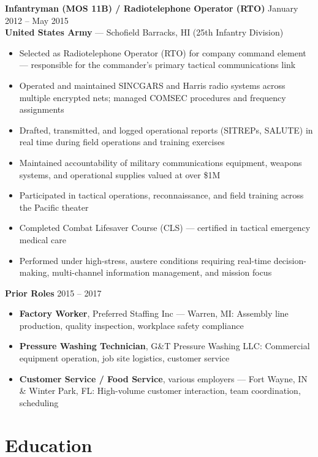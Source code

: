\documentclass[11pt,letterpaper]{article}
\begin{document}
\bigskip

\textbf{Infantryman (MOS 11B) / Radiotelephone Operator (RTO)} \hfill January 2012 -- May 2015\\
\textbf{United States Army} --- Schofield Barracks, HI (25th Infantry Division)
\begin{itemize}
  \item Selected as Radiotelephone Operator (RTO) for company command element --- responsible for the commander's primary tactical communications link
  \item Operated and maintained SINCGARS and Harris radio systems across multiple encrypted nets; managed COMSEC procedures and frequency assignments
  \item Drafted, transmitted, and logged operational reports (SITREPs, SALUTE) in real time during field operations and training exercises
  \item Maintained accountability of military communications equipment, weapons systems, and operational supplies valued at over \$1M
  \item Participated in tactical operations, reconnaissance, and field training across the Pacific theater
  \item Completed Combat Lifesaver Course (CLS) --- certified in tactical emergency medical care
  \item Performed under high-stress, austere conditions requiring real-time decision-making, multi-channel information management, and mission focus
\end{itemize}

\bigskip

\textbf{Prior Roles} \hfill 2015 -- 2017
\begin{itemize}
  \item \textbf{Factory Worker}, Preferred Staffing Inc --- Warren, MI: Assembly line production, quality inspection, workplace safety compliance
  \item \textbf{Pressure Washing Technician}, G\&T Pressure Washing LLC: Commercial equipment operation, job site logistics, customer service
  \item \textbf{Customer Service / Food Service}, various employers --- Fort Wayne, IN \& Winter Park, FL: High-volume customer interaction, team coordination, scheduling
\end{itemize}

\section{Education}
\end{document}
